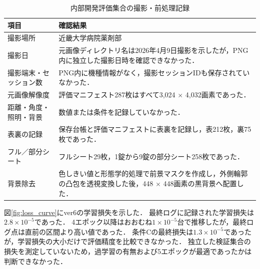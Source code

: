 \documentclass[uplatex,dvipdfmx]{jsarticle}
\begin{document}
\begin{table}[H]
  \centering
  \caption{内部開発評価集合の撮影・前処理記録}
  \label{tab:capture_conditions}
  \small
  \begin{tabular}{|p{4.0cm}|p{8.2cm}|}
    \hline
    項目 & 確認結果 \\ \hline
    撮影場所 & 近畿大学病院薬剤部 \\ \hline
    撮影日 & 元画像ディレクトリ名は2026年4月9日撮影を示したが，PNG内に独立した撮影日時を確認できなかった． \\ \hline
    撮影端末・セッション数 & PNG内に機種情報がなく，撮影セッションIDも保存されていなかった． \\ \hline
    元画像解像度 & 評価マニフェスト287枚はすべて3,024 $\times$ 4,032画素であった． \\ \hline
    距離・角度・照明・背景 & 数値または条件を記録していなかった． \\ \hline
    表裏の記録 & 保存台帳と評価マニフェストに表裏を記録し，表212枚，裏75枚であった． \\ \hline
    フル／部分シート & フルシート29枚，1錠から9錠の部分シート258枚であった． \\ \hline
    背景除去 & 色しきい値と形態学的処理で前景マスクを作成し，外側輪郭の凸包を透視変換した後，448 $\times$ 448画素の黒背景へ配置した． \\ \hline
  \end{tabular}
\end{table}

図\ref{fig:loss_curve}にver6の学習損失を示した．
最終ログに記録された学習損失は$2.8 \times 10^{-5}$であった．
4エポック以降はおおむね$1 \times 10^{-5}$台で推移したが，最終ログ点は直前の区間より高い値であった．
条件Cの最終損失は$1.3 \times 10^{-5}$であったが，学習損失の大小だけで評価精度を比較できなかった．
独立した検証集合の損失を測定していないため，過学習の有無および5エポックが最適であったかは判断できなかった．
\end{document}
